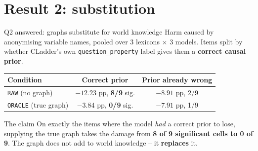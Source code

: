 \documentclass{beamer}
\begin{document}
\section{Result 2: substitution}
\begin{frame}
  \sectionpage
\end{frame}

\begin{frame}{Q2 answered: graphs substitute for world knowledge}
  Harm caused by anonymising variable names, pooled over 3 lexicons $\times$ 3
  models. Items split by whether CLadder's own \texttt{question\_property}
  label gives them a \textbf{correct causal prior}.

  \begin{center}
  \small
  \begin{tabular}{lcc}
    \toprule
    Condition & Correct prior & Prior already wrong \\
    \midrule
    \texttt{RAW} (no graph)      & $\mathbf{-12.23}$ pp, \textbf{8/9} sig. & $-8.91$ pp, 2/9 \\
    \texttt{ORACLE} (true graph) & $\mathbf{-3.84}$ pp, \textbf{0/9} sig.  & $-7.91$ pp, 1/9 \\
    \bottomrule
  \end{tabular}
  \end{center}

  \begin{block}{The claim}
    On exactly the items where the model \emph{had} a correct prior to lose,
    supplying the true graph takes the damage from \textbf{8 of 9 significant
    cells to 0 of 9}. The graph does not add to world knowledge --
    it \textbf{replaces} it.
  \end{block}
\end{frame}
\end{document}
